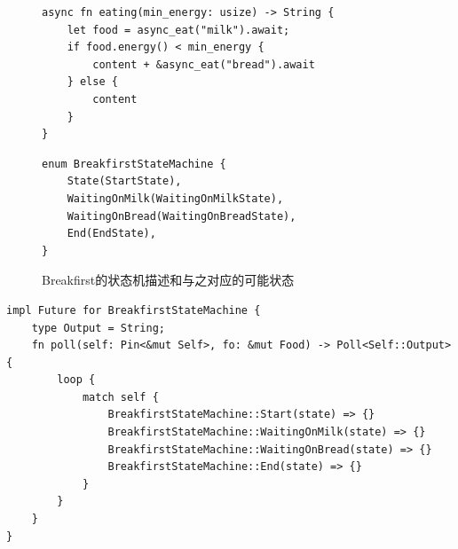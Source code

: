 \begin{figure}[htbp]
    \figureCapSet
	\centering
	\begin{minipage}{0.49\linewidth}%
		\centering
        \begin{lstlisting}[frame=none]
async fn eating(min_energy: usize) -> String {
    let food = async_eat("milk").await;
    if food.energy() < min_energy {
        content + &async_eat("bread").await
    } else {
        content
    }
}
        \end{lstlisting}
	\end{minipage}
    \hfill
	\begin{minipage}{0.49\linewidth}
		\centering
        \begin{lstlisting}[frame=none]
enum BreakfirstStateMachine {
    State(StartState),
    WaitingOnMilk(WaitingOnMilkState),
    WaitingOnBread(WaitingOnBreadState),
    End(EndState),
}
        \end{lstlisting}
	\end{minipage}
    \caption{Breakfirst的状态机描述和与之对应的可能状态}
\end{figure}

\begin{lstlisting}[caption=Breakfirst的状态转换]
impl Future for BreakfirstStateMachine {
    type Output = String;
    fn poll(self: Pin<&mut Self>, fo: &mut Food) -> Poll<Self::Output> {
        loop {
            match self {
                BreakfirstStateMachine::Start(state) => {}
                BreakfirstStateMachine::WaitingOnMilk(state) => {}
                BreakfirstStateMachine::WaitingOnBread(state) => {}
                BreakfirstStateMachine::End(state) => {}
            }
        }
    }
}
\end{lstlisting}



